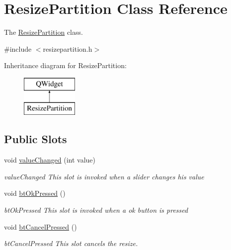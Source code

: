 \hypertarget{class_resize_partition}{}\section{Resize\+Partition Class Reference}
\label{class_resize_partition}


The \mbox{\hyperlink{class_resize_partition}{Resize\+Partition}} class.  




{\ttfamily \#include $<$resizepartition.\+h$>$}

Inheritance diagram for Resize\+Partition\+:\begin{figure}[H]
\begin{center}
\leavevmode
\includegraphics[height=2.000000cm]{class_resize_partition}
\end{center}
\end{figure}
\subsection*{Public Slots}
\begin{DoxyCompactItemize}
\item 
void \mbox{\hyperlink{class_resize_partition_a6cdad6be2f435ad46bcf0b537b062a40}{value\+Changed}} (int value)
\begin{DoxyCompactList}\small\item\em value\+Changed This slot is invoked when a slider changes his value \end{DoxyCompactList}\item 
void \mbox{\hyperlink{class_resize_partition_ab742e4bcdf7e0684ad3e8a787309ef5d}{bt\+Ok\+Pressed}} ()
\begin{DoxyCompactList}\small\item\em bt\+Ok\+Pressed This slot is invoked when a ok button is pressed \end{DoxyCompactList}\item 
void \mbox{\hyperlink{class_resize_partition_a82f2b0a7f31c72e0ea6176415ddb855c}{bt\+Cancel\+Pressed}} ()
\begin{DoxyCompactList}\small\item\em bt\+Cancel\+Pressed This slot cancels the resize. \end{DoxyCompactList}\end{DoxyCompactItemize}
